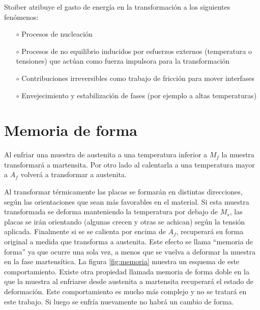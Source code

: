 \documentclass[a4paper,12pt,fleqn,twoside,openany]{book}
\begin{document}
 
Stoiber \cite{stoiber} atribuye el gasto de energía en la transformación a los siguientes fenómenos:
\begin{itemize}
 \item[$\circ$] Procesos de nucleación
 \item[$\circ$] Procesos de no equilibrio inducidos por esfuerzos externos (temperatura o tensiones) que actúan como fuerza impulsora para la 
 transformación
 \item[$\circ$] Contribuciones irreversibles como trabajo de fricción para mover interfases
 \item[$\circ$] Envejecimiento y estabilización de fases (por ejemplo a altas temperaturas) 
\end{itemize}



\section{Memoria de forma}

 Al enfriar una muestra de austenita a una temperatura inferior a $M_{f}$ la muestra transformará a martensita. Por otro lado al calentarla a una temperatura mayor a $A_{f}$ volverá a transformar a austenita. 
 
 Al transformar térmicamente las placas se formarán en distintas direcciones, según las orientaciones que sean más favorables en el material. Si esta muestra transformada se deforma manteniendo la temperatura por debajo de $M_s$, las placas se irán orientando (algunas crecen y otras se achican) según la tensión aplicada. Finalmente si se se calienta por encima de $A_{f}$, recuperará su forma original a medida que transforma a austenita. Este efecto se llama “memoria de forma” ya que ocurre una sola vez, a menos que se vuelva a deformar la muestra en la fase martensítica. La figura \ref{fig:memoria} muestra un esquema de este comportamiento. Existe otra propiedad llamada memoria de forma doble en la que la muestra al 
enfriarse desde austenita a martensita recuperará el estado de deformación. Este comportamiento es mucho más complejo y no se tratará en este trabajo. Si luego se enfría nuevamente no habrá un cambio de forma.
\end{document}
